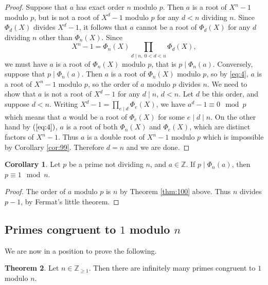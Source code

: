 \documentclass{article}
\newcommand{\Z}{\mathbb{Z}}
\newcommand{\rb}[1]{\left( #1 \right)}
\theoremstyle{definition}\newtheorem{definition}{Definition}
\theoremstyle{definition}\newtheorem{remark}[definition]{Remark}
\theoremstyle{definition}\newtheorem*{example}{Example}
\theoremstyle{definition}\newtheorem*{note}{Note}
\newtheorem{theorem}[definition]{Theorem}
\newtheorem{corollary}[definition]{Corollary}
\begin{document}
\begin{proof}
Suppose that $ a $ has exact order $ n $ modulo $ p $. Then $ a $ is a root of $ X^n - 1 $ modulo $ p $, but is not a root of $ X^d - 1 $ modulo $ p $ for any $ d < n $ dividing $ n $. Since $ \Phi_d\rb{X} $ divides $ X^d - 1 $, it follows that $ a $ cannot be a root of $ \Phi_d\rb{X} $ for any $ d $ dividing $ n $ other than $ \Phi_n\rb{X} $. Since
\begin{equation}
\label{eq:4}
X^n - 1 = \Phi_n\rb{X}\prod_{d \mid n, \ 0 < d < n} \Phi_d\rb{X},
\end{equation}
we must have $ a $ is a root of $ \Phi_n\rb{X} $ modulo $ p $, that is $ p \mid \Phi_n\rb{a} $. Conversely, suppose that $ p \mid \Phi_n\rb{a} $. Then $ a $ is a root of $ \Phi_n\rb{X} $ modulo $ p $, so by \ref{eq:4}, $ a $ is a root of $ X^n - 1 $ modulo $ p $, so the order of $ a $ modulo $ p $ divides $ n $. We need to show that $ a $ is not a root of $ X^d - 1 $ for any $ d \mid n $, $ d < n $. Let $ d $ be this order, and suppose $ d < n $. Writing $ X^d - 1 = \prod_{e \mid d} \Phi_e\rb{X} $, we have $ a^d - 1 \equiv 0 \mod p $ which means that $ a $ would be a root of $ \Phi_e\rb{X} $ for some $ e \mid d \mid n $. On the other hand by $ \rb{\ref{eq:4}} $, $ a $ is a root of both $ \Phi_n\rb{X} $ and $ \Phi_e\rb{X} $, which are distinct factors of $ X^n - 1 $. Thus $ a $ is a double root of $ X^n - 1 $ modulo $ p $ which is impossible by Corollary \ref{cor:99}. Therefore $ d = n $ and we are done.
\end{proof}

\begin{corollary}
\label{cor:101}
Let $ p $ be a prime not dividing $ n $, and $ a \in \Z $. If $ p \mid \Phi_n\rb{a} $, then $ p \equiv 1 \mod n $.
\end{corollary}

\begin{proof}
The order of $ a $ modulo $ p $ is $ n $ by Theorem \ref{thm:100} above. Thus $ n $ divides $ p - 1 $, by Fermat's little theorem.
\end{proof}

\subsection{Primes congruent to $ 1 $ modulo $ n $}

We are now in a position to prove the following.

\begin{theorem}
Let $ n \in \Z_{\ge 1} $. Then there are infinitely many primes congruent to $ 1 $ modulo $ n $.
\end{theorem}
\end{document}
